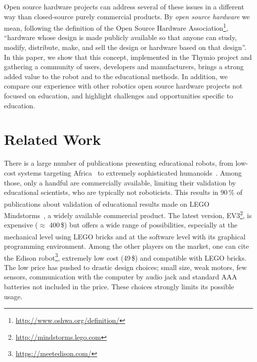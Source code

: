 \documentclass[letterpaper, 10 pt, conference]{ieeeconf}  %
\begin{document}
Open source hardware projects can address several of these issues in a different way than closed-source purely commercial products. 
By \textit{open source hardware} we mean, following the definition of the Open Source Hardware Association\footnote{\url{http://www.oshwa.org/definition/}}, ``hardware whose design is made publicly available so that anyone can study, modify, distribute, make, and sell the design or hardware based on that design''.
In this paper, we show that this concept, implemented in the Thymio project and gathering a community of users, developers and manufacturers, brings a strong added value to the robot and to the educational methods.
In addition, we compare our experience with other robotics open source hardware projects not focused on education, and highlight challenges and opportunities specific to education.

\section{Related Work}

There is a large number of publications presenting educational robots, from low-cost systems targeting Africa~\cite{Rubenstein2015,Gyebi2015} to extremely sophisticated humanoids~\cite{Hood2015,Mazzoni2016}. 
Among those, only a handful are commercially available, limiting their validation by educational scientists, who are typically not roboticists.
This results in 90\,\% of publications about validation of educational results made on LEGO\textsuperscript{\textregistered} Mindstorms\textsuperscript{\textregistered}~\cite{benitti2012exploring}, a widely available commercial product.
The latest version, EV3\footnote{\url{http://mindstorms.lego.com}}, is expensive ($\approx$ 400\,\$) but offers a wide range of possibilities, especially at the mechanical level using LEGO\textsuperscript{\textregistered} bricks and at the software level with its graphical programming environment. 
Among the other players on the market, one can cite the Edison robot\footnote{\url{https://meetedison.com/}}, extremely low cost (49\,\$) and compatible with LEGO\textsuperscript{\textregistered} bricks. The low price has pushed to drastic design choices; small size, weak motors, few sensors, communication with the computer by audio jack and standard AAA batteries not included in the price.
These choices strongly limits its possible usage.
\end{document}
